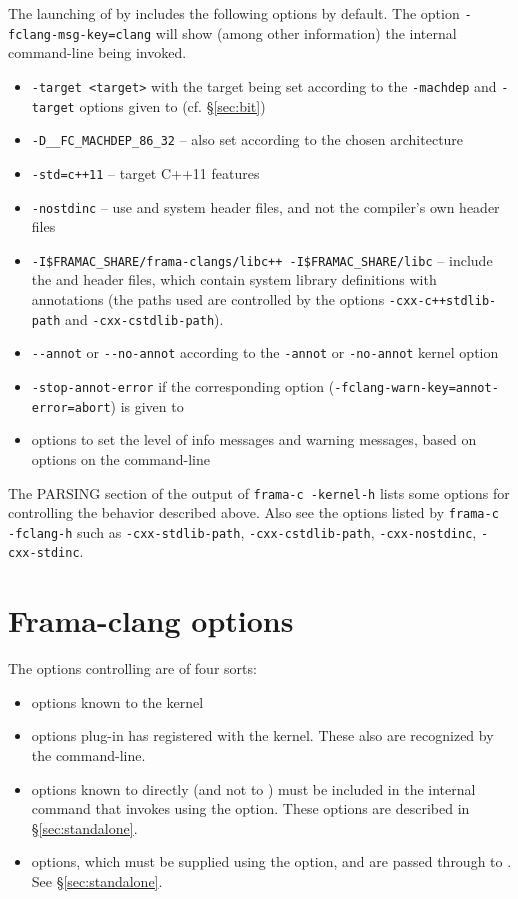 The launching of \irg by \framac includes the following options by default. The \fc option \lstinline|-fclang-msg-key=clang| will show (among other information) the internal command-line being invoked.
\begin{itemize}
\item \verb|-target <target>| with the target being set according to the \lstinline|-machdep| and \lstinline|-target| options given to \framac (cf. \S\ref{sec:bit})
\item \verb|-D__FC_MACHDEP_86_32| -- also set according to the chosen architecture
\item \verb|-std=c++11| -- target C++11 features
\item \verb|-nostdinc| -- use \fcl and \framac system header files, and not the compiler's own header files
\item \verb|-I$FRAMAC_SHARE/frama-clangs/libc++ -I$FRAMAC_SHARE/libc| -- include the \fclang and \framac header files, which contain system library definitions with \acslpp annotations (the paths used are controlled by the \fc options \lstinline|-cxx-c++stdlib-path| and \lstinline|-cxx-cstdlib-path|).
\item \verb|--annot| or \verb|--no-annot| according to the \verb|-annot| or \verb|-no-annot| \framac kernel option
\item \verb|-stop-annot-error| if the corresponding option (\lstinline|-fclang-warn-key=annot-error=abort|) is given to \framac
\item options to set the level of info messages and warning messages, based on options on the \fc command-line
\end{itemize}

The PARSING section of the output of \lstinline|frama-c -kernel-h| lists some options for controlling the behavior described above. Also see the options listed by \lstinline|frama-c -fclang-h| such as \lstinline|-cxx-stdlib-path|, \lstinline|-cxx-cstdlib-path|, \lstinline|-cxx-nostdinc|, \lstinline|-cxx-stdinc|.

\section{Frama-clang options}

The options controlling \fclang are of four sorts:
\begin{itemize}
\item options known to the \framac kernel 
\item options  \fcl plug-in has registered with the \fc kernel. These also are recognized by the \fc command-line.
\item options known to \irg directly (and not to \fc) must be 
included in the internal command that invokes \irg using the  option. These options are described in \S\ref{sec:standalone}.
\item \clang options, which must be supplied using the  option, and are passed through \irg to \cl. See \S\ref{sec:standalone}.
\end{itemize}

